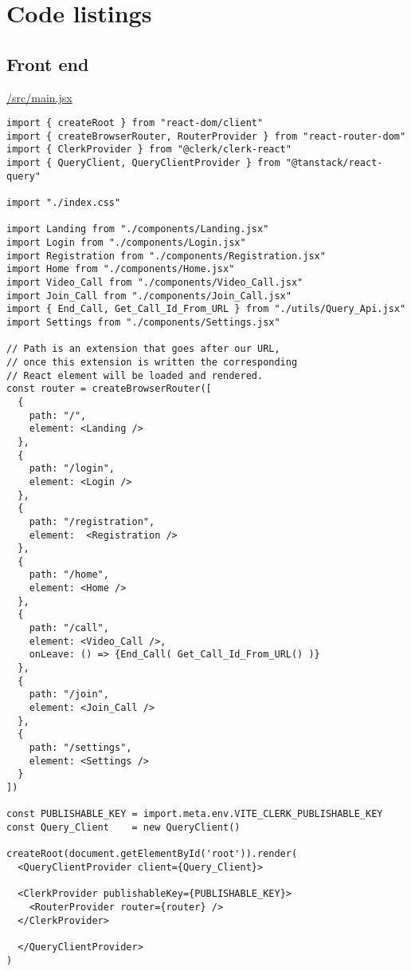 \appendix

\chapter{Code listings}

\section{Front end}

\underline{/src/main.jsx}

\begin{verbatim}
import { createRoot } from "react-dom/client"
import { createBrowserRouter, RouterProvider } from "react-router-dom"
import { ClerkProvider } from "@clerk/clerk-react"
import { QueryClient, QueryClientProvider } from "@tanstack/react-query"

import "./index.css"

import Landing from "./components/Landing.jsx"
import Login from "./components/Login.jsx"
import Registration from "./components/Registration.jsx"
import Home from "./components/Home.jsx"
import Video_Call from "./components/Video_Call.jsx"
import Join_Call from "./components/Join_Call.jsx"
import { End_Call, Get_Call_Id_From_URL } from "./utils/Query_Api.jsx"
import Settings from "./components/Settings.jsx"

// Path is an extension that goes after our URL,
// once this extension is written the corresponding
// React element will be loaded and rendered.
const router = createBrowserRouter([
  {
    path: "/",
    element: <Landing />
  },
  {
    path: "/login",
    element: <Login />
  },
  {
    path: "/registration",
    element:  <Registration />
  },
  {
    path: "/home",
    element: <Home />
  },
  {
    path: "/call",
    element: <Video_Call />,
    onLeave: () => {End_Call( Get_Call_Id_From_URL() )}
  },
  {
    path: "/join",
    element: <Join_Call />
  },
  {
    path: "/settings",
    element: <Settings />
  }
])

const PUBLISHABLE_KEY = import.meta.env.VITE_CLERK_PUBLISHABLE_KEY
const Query_Client    = new QueryClient()

createRoot(document.getElementById('root')).render(
  <QueryClientProvider client={Query_Client}>

  <ClerkProvider publishableKey={PUBLISHABLE_KEY}>
    <RouterProvider router={router} />
  </ClerkProvider>

  </QueryClientProvider>
)
\end{verbatim}

